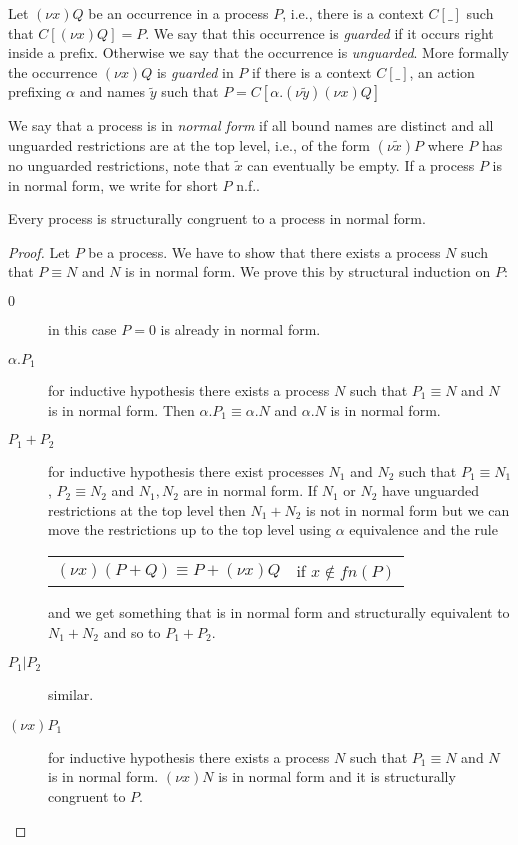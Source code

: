 \begin{definition}
  Let $(\nu x)Q$ be an occurrence in a process $P$, i.e., there is a context $C[\_]$ such that $C[(\nu x)Q]=P$. We say that this occurrence is \emph{guarded} if it occurs right inside a prefix. Otherwise we say that the occurrence is \emph{unguarded}. More formally the occurrence $(\nu x)Q$ is \emph{guarded} in $P$ if there is a context $C[\_]$, an action prefixing $\alpha$ and names $\tilde{y}$ such that $P=C[\alpha.(\nu \tilde{y})(\nu x)Q]$
\end{definition}

\begin{definition}
  We say that a process is in \emph{normal form} if all bound names are distinct and all unguarded restrictions are at the top level, i.e., of the form $(\nu \tilde{x})P$ where $P$ has no unguarded restrictions, note that $\tilde{x}$ can eventually be empty. If a process $P$ is in normal form, we write for short $P$ n.f.. 
\end{definition}

\begin{lemma}\label{existenceOfNormalForm}
  Every process is structurally congruent to a process in normal form.
  \begin{proof}
    Let $P$ be a process. We have to show that there exists a process $N$ such that $P \equiv N$ and $N$ is in normal form. We prove this by structural induction on $P$:
    \begin{description}
      \item[$0$] 
	in this case $P=0$ is already in normal form.
      \item[$\alpha.P_{1}$] 
	for inductive hypothesis there exists a process $N$ such that $P_{1} \equiv N$ and $N$ is in normal form. Then $\alpha.P_{1} \equiv \alpha.N$ and $\alpha.N$ is in normal form.
      \item[$P_{1}+P_{2}$]
	for inductive hypothesis there exist processes $N_{1}$ and $N_{2}$ such that $P_{1} \equiv N_{1}$, $P_{2} \equiv N_{2}$ and $N_{1}, N_{2}$ are in normal form. If $N_{1}$ or $N_{2}$ have unguarded restrictions at the top level then $N_{1}+N_{2}$ is not in normal form but we can move the restrictions up to the top level using $\alpha$ equivalence and the rule 
	\begin{center}
	  \begin{tabular}{ll}
	      $(\nu x)(P+Q) \equiv P + (\nu x)Q$ 
	    &
	      if $x\notin fn(P)$
	  \end{tabular}
	\end{center}
	and we get something that is in normal form and structurally equivalent to $N_{1}+N_{2}$ and so to $P_{1}+P_{2}$.
      \item[$P_{1}|P_{2}$] similar.
      \item[$(\nu x)P_{1}$] 
	for inductive hypothesis there exists a process $N$ such that $P_{1} \equiv N$ and $N$ is in normal form. $(\nu x)N$ is in normal form and it is structurally congruent to $P$.
    \end{description}
  \end{proof}
\end{lemma}


